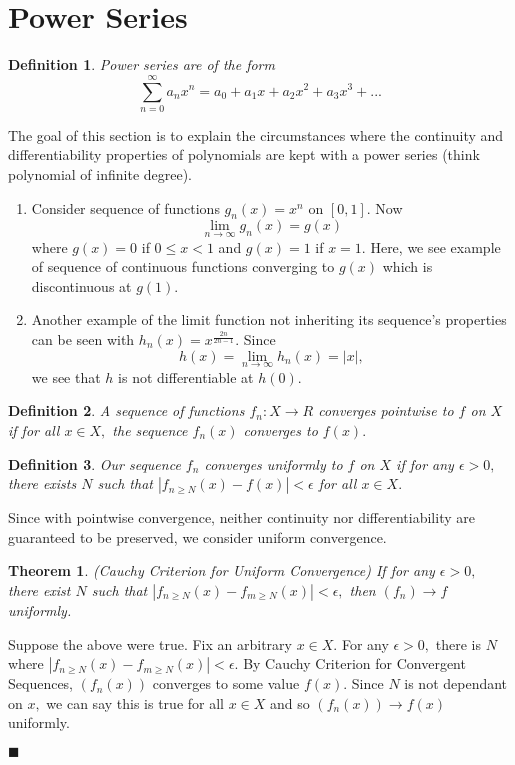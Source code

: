 \documentclass{article}
\newtheorem{defn}{Definition}
\newtheorem{theorem}{Theorem}
\renewcommand{\qed}{\hfill$\blacksquare$}
\renewenvironment{proof}{\begin{addmargin}[1em]{0em}\begin{newproof}}{\end{newproof}\end{addmargin}\qed}
\begin{document}
\title{}
\author{}
\maketitle

\section{Power Series} 
\begin{defn} 
Power series are of the form $$\sum_{n=0}^\infty a_nx^n = a_0+a_1x+a_2x^2+a_3x^3+...$$ 
\end{defn}

The goal of this section is to explain the circumstances where the continuity and differentiability properties of polynomials are kept with a power series (think polynomial of infinite degree). 

\begin{shaded} 
\begin{enumerate} 
    \item Consider sequence of functions $g_n(x)=x^n$ on $[0, 1].$ Now $$\lim_{n \rightarrow \infty} g_n(x) = g(x)$$ where $g(x)=0$ if $0 \le x < 1$ and $g(x)=1$ if $x=1.$ Here, we see example of sequence of continuous functions converging to $g(x)$ which is discontinuous at $g(1).$
    \item Another example of the limit function not inheriting its sequence's properties can be seen with $h_n(x) = x^{\frac{2n}{2n-1}}.$ Since $$h(x) = \lim_{n \rightarrow \infty} h_n(x) = |x|,$$ we see that $h$ is not differentiable at $h(0).$
\end{enumerate}
\end{shaded}

\begin{defn}
A sequence of functions $f_n: X \rightarrow R$ converges pointwise to $f$ on $X$ if for all $x \in X,$ the sequence $f_n(x)$ converges to $f(x).$
\end{defn}

\begin{defn}
Our sequence $f_n$ converges uniformly to $f$ on $X$ if for any $\epsilon > 0,$ there exists $N$ such that $|f_{n \ge N}(x)-f(x)|<\epsilon$ for all $x \in X.$
\end{defn}
\noindent Since with pointwise convergence, neither continuity nor differentiability are guaranteed to be preserved, we consider uniform convergence.

\begin{theorem}{(Cauchy Criterion for Uniform Convergence)}
If for any $\epsilon > 0,$ there exist $N$ such that $|f_{n \ge N}(x) - f_{m \ge N}(x)| < \epsilon,$ then $(f_n) \rightarrow f$ uniformly.
\end{theorem}
\begin{proof}
Suppose the above were true. Fix an arbitrary $x \in X.$ For any $\epsilon > 0,$ there is $N$ where $|f_{n \ge N}(x) - f_{m \ge N}(x)| < \epsilon.$ By Cauchy Criterion for Convergent Sequences, $(f_n(x))$ converges to some value $f(x).$ Since $N$ is not dependant on $x,$ we can say this is true for all $x \in X$ and so $(f_n(x)) \rightarrow f(x)$ uniformly.
\end{proof}
\end{document}
